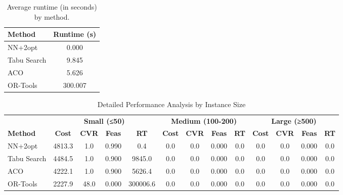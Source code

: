 \begin{table}[ht]
\centering
\caption{Average runtime (in seconds) by method.}
\label{tab:runtime_summary}
\begin{tabular}{lc}
\toprule
\textbf{Method} & \textbf{Runtime (s)} \\
\midrule
NN+2opt & 0.000 \\
Tabu Search & 9.845 \\
ACO & 5.626 \\
OR-Tools & 300.007 \\
\bottomrule
\end{tabular}
\end{table}


\begin{table}[ht]
\centering
\caption{Detailed Performance Analysis by Instance Size}
\label{tab:detailed_size_performance}
\begin{tabular}{lcccccccccccc}
\toprule
& \multicolumn{4}{c}{\textbf{Small (≤50)}} & \multicolumn{4}{c}{\textbf{Medium (100-200)}} & \multicolumn{4}{c}{\textbf{Large (≥500)}} \\
\cmidrule(r){2-5} \cmidrule(r){6-9} \cmidrule(l){10-13}
\textbf{Method} & \textbf{Cost} & \textbf{CVR} & \textbf{Feas} & \textbf{RT} & \textbf{Cost} & \textbf{CVR} & \textbf{Feas} & \textbf{RT} & \textbf{Cost} & \textbf{CVR} & \textbf{Feas} & \textbf{RT} \\
\midrule
NN+2opt & 4813.3 & 1.0 & 0.990 & 0.4 & 0.0 & 0.0 & 0.000 & 0.0 & 0.0 & 0.0 & 0.000 & 0.0 \\
Tabu Search & 4484.5 & 1.0 & 0.900 & 9845.0 & 0.0 & 0.0 & 0.000 & 0.0 & 0.0 & 0.0 & 0.000 & 0.0 \\
ACO & 4222.1 & 1.0 & 0.900 & 5626.4 & 0.0 & 0.0 & 0.000 & 0.0 & 0.0 & 0.0 & 0.000 & 0.0 \\
OR-Tools & 2227.9 & 48.0 & 0.000 & 300006.6 & 0.0 & 0.0 & 0.000 & 0.0 & 0.0 & 0.0 & 0.000 & 0.0 \\
\bottomrule
\end{tabular}
\end{table}


